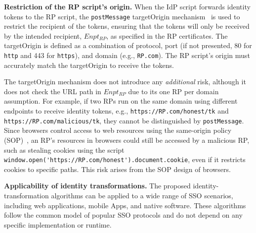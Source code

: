\noindent \textbf{Restriction of the RP script's origin.}
When the IdP script forwards identity tokens to the RP script, the \verb+postMessage+ targetOrigin mechanism~\cite{postm-targeto} is used to restrict the recipient of the tokens, ensuring that the tokens will only be received by the intended recipient, $Enpt_{RP}$, as specified in the RP certificates. The targetOrigin is defined as a combination of protocol, port (if not presented, 80 for \verb+http+ and 443 for \verb+https+), and domain (e.g., \verb+RP.com+). The RP script's origin must accurately match the targetOrigin to receive the tokens. 

The targetOrigin mechanism does not introduce any {\em additional} risk, although it does not check the URL path in $Enpt_{RP}$ %
due to its one RP per domain assumption. For example, if two RPs run on the same domain using different endpoints to receive identity tokens, e.g., \verb+https://RP.com/honest/tk+ and \verb+https://RP.com/malicious/tk+, they cannot be distinguished by \verb+postMessage+. Since browsers control access to web resources using the same-origin policy (SOP)~\cite{sop}, an RP's resources in browsers could still be accessed by a malicious RP, such as stealing cookies using the script \verb+window.open('https://RP.com/honest').document.cookie+, even if it restricts cookies to specific paths. This risk arises from the SOP design of browsers. %



\noindent \textbf{Applicability of identity transformations.} 
The proposed identity-transformation algorithms %
can be applied to a wide range of SSO scenarios, including web applications, mobile Apps, and native software. These algorithms follow the common model of popular SSO protocols and do not depend on any specific implementation or runtime.%



